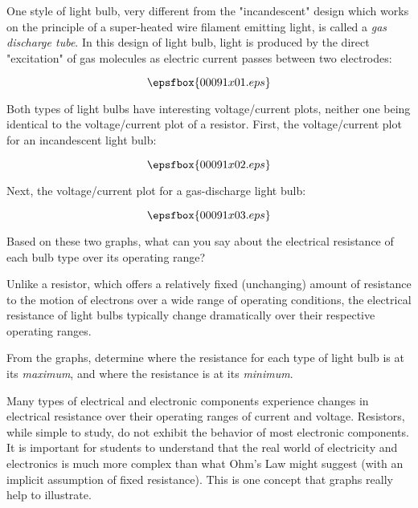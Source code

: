 

One style of light bulb, very different from the "incandescent" design which works on the principle of a super-heated wire filament emitting light, is called a {\it gas discharge tube}.  In this design of light bulb, light is produced by the direct "excitation" of gas molecules as electric current passes between two electrodes:

$$\epsfbox{00091x01.eps}$$

Both types of light bulbs have interesting voltage/current plots, neither one being identical to the voltage/current plot of a resistor.  First, the voltage/current plot for an incandescent light bulb:
 
$$\epsfbox{00091x02.eps}$$

Next, the voltage/current plot for a gas-discharge light bulb:

$$\epsfbox{00091x03.eps}$$

Based on these two graphs, what can you say about the electrical resistance of each bulb type over its operating range?







Unlike a resistor, which offers a relatively fixed (unchanging) amount of resistance to the motion of electrons over a wide range of operating conditions, the electrical resistance of light bulbs typically change dramatically over their respective operating ranges.

From the graphs, determine where the resistance for each type of light bulb is at its {\it maximum}, and where the resistance is at its {\it minimum}.







Many types of electrical and electronic components experience changes in electrical resistance over their operating ranges of current and voltage.  Resistors, while simple to study, do not exhibit the behavior of most electronic components.  It is important for students to understand that the real world of electricity and electronics is much more complex than what Ohm's Law might suggest (with an implicit assumption of fixed resistance).  This is one concept that graphs really help to illustrate.




